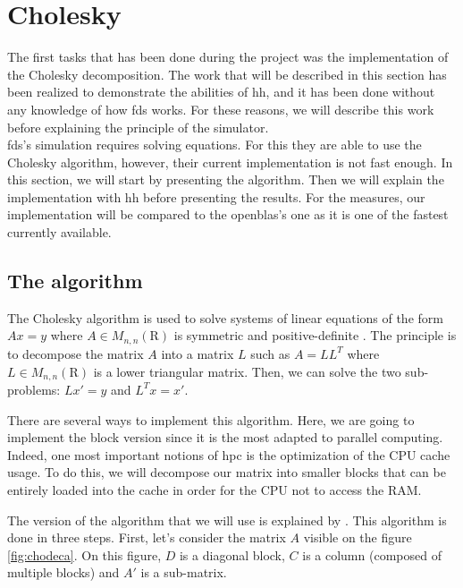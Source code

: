 
\clearpage{}
\section{Cholesky}

The first tasks that has been done during the project was the implementation of
the Cholesky decomposition. The work that will be described in this section has
been realized to demonstrate the abilities of \gls{hh}, and it has been done
without any knowledge of how \gls{fds} works. For these reasons, we will
describe this work before explaining the principle of the simulator.\\

\gls{fds}'s simulation requires solving equations. For this they are able to use
the Cholesky algorithm, however, their current implementation is not fast
enough. In this section, we will start by presenting the algorithm. Then we will
explain the implementation with \gls{hh} before presenting the results. For the
measures, our implementation will be compared to the openblas's one as it is one
of the fastest currently available.

\subsection{The algorithm}
\label{sec:choalgo}

The Cholesky algorithm is used to solve systems of linear equations of the form
$Ax = y$ where $A \in M_{n,n}(\mathrm{R})$ is symmetric and positive-definite
\cite{choleskywiki}. The principle is to decompose the matrix $A$ into a matrix
$L$ such as $A = LL^{T}$ where $L \in M_{n,n}(\mathrm{R})$ is a lower triangular
matrix. Then, we can solve the two sub-problems: $Lx' = y$ and $L^{T}x = x'$.

There are several ways to implement this algorithm. Here, we are going to
implement the block version since it is the most adapted to parallel computing.
Indeed, one most important notions of \gls{hpc} is the optimization of the CPU
cache usage. To do this, we will decompose our matrix into smaller blocks that
can be entirely loaded into the cache in order for the CPU not to access the
RAM.

The version of the algorithm that we will use is explained by
\cite{choleskyblock}. This algorithm is done in three steps. First, let's
consider the matrix $A$ visible on the figure \ref{fig:chodeca}. On this figure,
$D$ is a diagonal block, $C$ is a column (composed of multiple blocks) and $A'$
is a sub-matrix.


